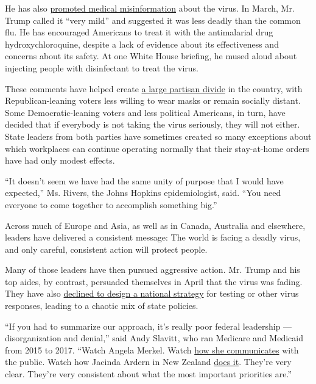 He has also
\href{https://www.theatlantic.com/politics/archive/2020/07/trumps-lies-about-coronavirus/608647/}{promoted
medical misinformation} about the virus. In March, Mr. Trump called it
``very mild'' and suggested it was less deadly than the common flu. He
has encouraged Americans to treat it with the antimalarial drug
hydroxychloroquine, despite a lack of evidence about its effectiveness
and concerns about its safety. At one White House briefing, he mused
aloud about injecting people with disinfectant to treat the virus.

These comments have helped create
\href{https://www.pewresearch.org/politics/2020/06/25/republicans-democrats-move-even-further-apart-in-coronavirus-concerns/}{a
large partisan divide} in the country, with Republican-leaning voters
less willing to wear masks or remain socially distant. Some
Democratic-leaning voters and less political Americans, in turn, have
decided that if everybody is not taking the virus seriously, they will
not either. State leaders from both parties have sometimes created so
many exceptions about which workplaces can continue operating normally
that their stay-at-home orders have had only modest effects.

``It doesn't seem we have had the same unity of purpose that I would
have expected,'' Ms. Rivers, the Johns Hopkins epidemiologist, said.
``You need everyone to come together to accomplish something big.''

Across much of Europe and Asia, as well as in Canada, Australia and
elsewhere, leaders have delivered a consistent message: The world is
facing a deadly virus, and only careful, consistent action will protect
people.

Many of those leaders have then pursued aggressive action. Mr. Trump and
his top aides, by contrast, persuaded themselves in April that the virus
was fading. They have also
\href{https://www.nytimes.com/2020/07/18/us/politics/trump-coronavirus-response-failure-leadership.html}{declined
to design a national strategy} for testing or other virus responses,
leading to a chaotic mix of state policies.

``If you had to summarize our approach, it's really poor federal
leadership --- disorganization and denial,'' said Andy Slavitt, who ran
Medicare and Medicaid from 2015 to 2017. ``Watch Angela Merkel. Watch
\href{https://nymag.com/intelligencer/2020/03/angela-merkel-nails-coronavirus-speech-unlike-trump.html}{how
she communicates} with the public. Watch how Jacinda Ardern in New
Zealand
\href{https://theconversation.com/three-reasons-why-jacinda-arderns-coronavirus-response-has-been-a-masterclass-in-crisis-leadership-135541}{does
it}. They're very clear. They're very consistent about what the most
important priorities are.''

